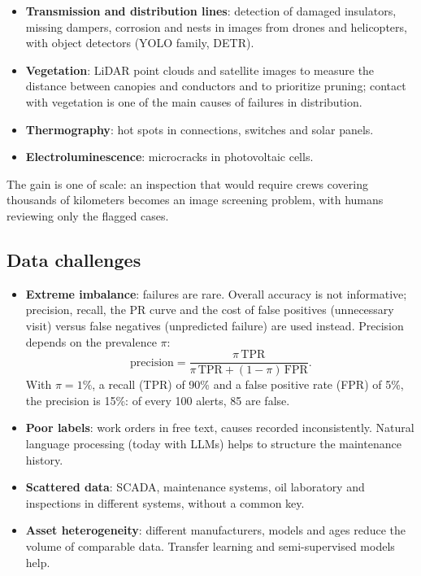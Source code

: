 \documentclass[10pt,a4paper,oneside]{article}
\begin{document}
\begin{itemize}
  \item \textbf{Transmission and distribution lines}: detection of damaged
    insulators, missing dampers, corrosion and nests in images from drones
    and helicopters, with object detectors (YOLO family, DETR).
  \item \textbf{Vegetation}: LiDAR point clouds and satellite images to
    measure the distance between canopies and conductors and to prioritize
    pruning; contact with vegetation is one of the main causes of failures
    in distribution.
  \item \textbf{Thermography}: hot spots in connections, switches and solar
    panels.
  \item \textbf{Electroluminescence}: microcracks in photovoltaic cells.
\end{itemize}
The gain is one of scale: an inspection that would require crews covering
thousands of kilometers becomes an image screening problem, with humans
reviewing only the flagged cases.

\subsection{Data challenges}
\begin{itemize}
  \item \textbf{Extreme imbalance}: failures are rare. Overall accuracy is
    not informative; precision, recall, the PR curve and the cost of false
    positives (unnecessary visit) versus false negatives (unpredicted
    failure) are used instead. Precision depends on the prevalence $\pi$:
    \begin{equation}
      \text{precision} = \frac{\pi\,\mathrm{TPR}}
        {\pi\,\mathrm{TPR} + (1 - \pi)\,\mathrm{FPR}}.
    \end{equation}
    With $\pi = 1\%$, a recall (TPR) of 90\% and a false positive rate (FPR)
    of 5\%, the precision is 15\%: of every 100 alerts, 85 are false.
  \item \textbf{Poor labels}: work orders in free text, causes recorded
    inconsistently. Natural language processing (today with LLMs) helps to
    structure the maintenance history.
  \item \textbf{Scattered data}: SCADA, maintenance systems, oil laboratory
    and inspections in different systems, without a common key.
  \item \textbf{Asset heterogeneity}: different manufacturers, models and
    ages reduce the volume of comparable data. Transfer learning and
    semi-supervised models help.
\end{itemize}
\end{document}
